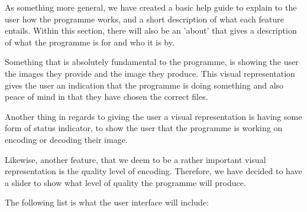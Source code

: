 As something more general, we have created a basic help guide to explain to the user how the programme works, and a short description of what each feature entails.
Within this section, there will also be an 'about' that gives a description of what the programme is for and who it is by.

Something that is absolutely fundamental to the programme, is showing the user the images they provide and the image they produce.
This visual representation gives the user an indication that the programme is doing something and also peace of mind in that they have chosen the correct files.

Another thing in regards to giving the user a visual representation is having some form of status indicator, to show the user that the programme is working on encoding or decoding their image.

Likewise, another feature, that we deem to be a rather important visual representation is the quality level of encoding.
Therefore, we have decided to have a slider to show what level of quality the programme will produce.

The following list is what the user interface will include:

